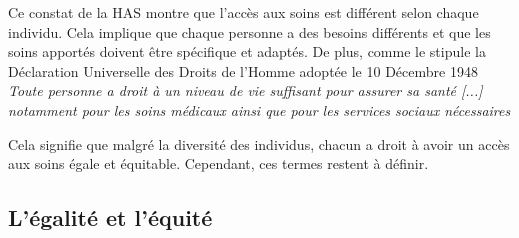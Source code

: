 Ce constat de la HAS montre que l'accès aux soins est différent selon chaque individu. Cela implique que chaque personne a des besoins différents et que les soins apportés doivent être spécifique et adaptés. De plus, comme le stipule la Déclaration Universelle des Droits de l'Homme adoptée le 10 Décembre 1948 \cite{DUDH} \og \textit{Toute personne a droit à un niveau de vie suffisant pour assurer sa santé [...] notamment pour les soins médicaux ainsi que pour les services sociaux nécessaires} \fg{}


Cela signifie que malgré la diversité des individus, chacun a droit à avoir un accès aux soins égale et équitable. Cependant, ces termes restent à définir.

\subsection{L'égalité et l'équité}
